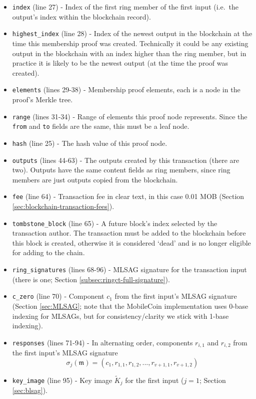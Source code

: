 \begin{appendices}
\begin{itemize}
	\item {\tt index} (line 27) - Index of the first ring member of the first input (i.e.\ the output's index within the blockchain record).
	\item {\tt highest\_index} (line 28) - Index of the newest output in the blockchain at the time this membership proof was created. Technically it could be any existing output in the blockchain with an index higher than the ring member, but in practice it is likely to be the newest output (at the time the proof was created).
	\item {\tt elements} (lines 29-38) - Membership proof elements, each is a node in the proof's Merkle tree.
	\item {\tt range} (lines 31-34) - Range of elements this proof node represents. Since the {\tt from} and {\tt to} fields are the same, this must be a leaf node.
    \item {\tt hash} (line 25) - The hash value of this proof node.

    \item {\tt outputs} (lines 44-63) - The outputs created by this transaction (there are two). Outputs have the same content fields as ring members, since ring members are just outputs copied from the blockchain.
    \item {\tt fee} (line 64) - Transaction fee in clear text, in this case 0.01 MOB (Section \ref{sec:blockchain-transaction-fees}).
    \item {\tt tombstone\_block} (line 65) - A future block's index selected by the transaction author. The transaction must be added to the blockchain before this block is created, otherwise it is considered `dead' and is no longer eligible for adding to the chain.

    \item {\tt ring\_signatures} (lines 68-96) - MLSAG signature for the transaction input (there is one; Section \ref{subsec:ringct-full-signature}).
    \item {\tt c\_zero} (line 70) - Component \(c_1\) from the first input's MLSAG signature (Section \ref{sec:MLSAG}; note that the MobileCoin implementation uses 0-base indexing for MLSAGs, but for consistency/clarity we stick with 1-base indexing).
    \item {\tt responses} (lines 71-94) - In alternating order, components \(r_{i,1}\) and \(r_{i,2}\) from the first input's MLSAG signature
    \[\sigma_j(\mathfrak{m}) = (c_1, r_{1, 1}, r_{1, 2}, ..., r_{v+1, 1}, r_{v+1, 2})\]
    \item {\tt key\_image} (line 95) - Key image $\tilde{K}_j$ for the first input ($j = 1$; Section \ref{sec:blsag}).


\end{itemize}
\end{appendices}
